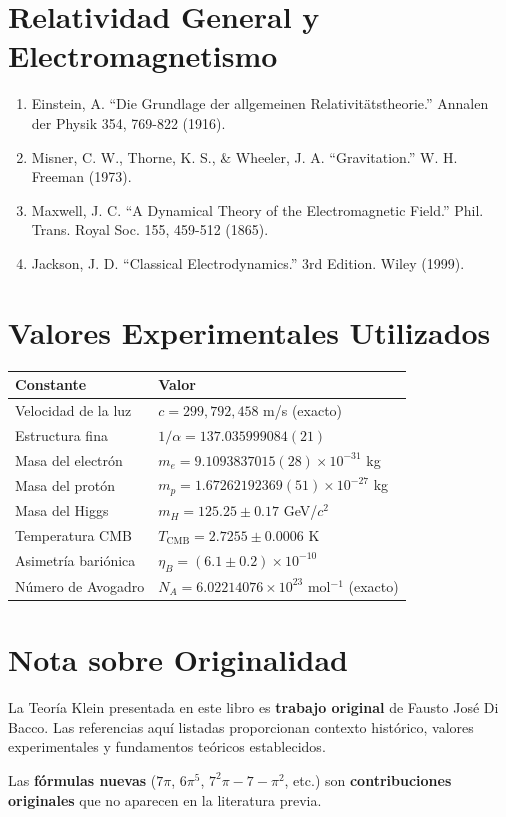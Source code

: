 \section{Relatividad General y Electromagnetismo}

\begin{enumerate}
    \item Einstein, A. ``Die Grundlage der allgemeinen Relativitätstheorie.'' Annalen der Physik 354, 769-822 (1916).

    \item Misner, C. W., Thorne, K. S., \& Wheeler, J. A. ``Gravitation.'' W. H. Freeman (1973).

    \item Maxwell, J. C. ``A Dynamical Theory of the Electromagnetic Field.'' Phil. Trans. Royal Soc. 155, 459-512 (1865).

    \item Jackson, J. D. ``Classical Electrodynamics.'' 3rd Edition. Wiley (1999).
\end{enumerate}


\section{Valores Experimentales Utilizados}

\begin{table}[H]
\centering
\begin{tabular}{ll}
\toprule
\textbf{Constante} & \textbf{Valor} \\
\midrule
Velocidad de la luz & $c = 299,792,458$ m/s (exacto) \\
Estructura fina & $1/\alpha = 137.035999084(21)$ \\
Masa del electrón & $m_e = 9.1093837015(28) \times 10^{-31}$ kg \\
Masa del protón & $m_p = 1.67262192369(51) \times 10^{-27}$ kg \\
Masa del Higgs & $m_H = 125.25 \pm 0.17$ GeV/$c^2$ \\
Temperatura CMB & $T_{\text{CMB}} = 2.7255 \pm 0.0006$ K \\
Asimetría bariónica & $\eta_B = (6.1 \pm 0.2) \times 10^{-10}$ \\
Número de Avogadro & $N_A = 6.02214076 \times 10^{23}$ mol$^{-1}$ (exacto) \\
\bottomrule
\end{tabular}
\end{table}


\section{Nota sobre Originalidad}

La Teoría Klein presentada en este libro es \textbf{trabajo original} de Fausto José Di Bacco. Las referencias aquí listadas proporcionan contexto histórico, valores experimentales y fundamentos teóricos establecidos.

Las \textbf{fórmulas nuevas} ($7\pi$, $6\pi^5$, $7^2\pi - 7 - \pi^2$, etc.) son \textbf{contribuciones originales} que no aparecen en la literatura previa.
